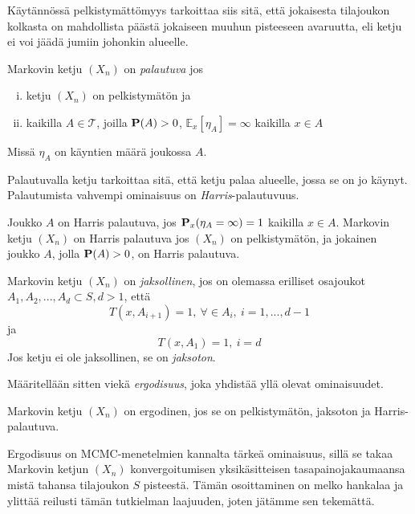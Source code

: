 Käytännössä pelkistymättömyys tarkoittaa siis sitä, että jokaisesta tilajoukon kolkasta on mahdollista päästä jokaiseen muuhun pisteeseen avaruutta, eli ketju ei voi jäädä jumiin johonkin alueelle.

\begin{maar}
	Markovin ketju $(X_n)$ on \textit{palautuva} jos
	\begin{enumerate}[(i)]
		\item ketju $(X_n)$ on pelkistymätön ja
		\item kaikilla $A\in \mathcal{T}$, joilla $\textbf{P}(A)>0$, $\mathbb{E}_x [\eta_A]=\infty$ kaikilla $x\in A$
	\end{enumerate}
	Missä $\eta_A$ on käyntien määrä joukossa $A$.
\end{maar}

Palautuvalla ketju tarkoittaa sitä, että ketju palaa alueelle, jossa se on jo käynyt. Palautumista vahvempi ominaisuus on \textit{Harris}-palautuvuus.

\begin{maar}
	Joukko $A$ on Harris palautuva, jos $\textbf{P}_x(\eta_A =\infty) = 1$ kaikilla $x\in A$. Markovin ketju $(X_n)$ on Harris palautuva jos $(X_n)$ on pelkistymätön, ja jokainen joukko $A$, jolla $\textbf{P}(A)>0$, on Harris palautuva.
\end{maar}

\begin{maar}
	Markovin ketju $(X_n)$ on \emph{jaksollinen}, jos on olemassa erilliset osajoukot $A_1, A_2,...,A_d \subset S, d > 1$, että 
	\begin{equation}
		T(x, A_{i+1}) = 1 , \: \forall \in A_i, \: i=1,...,d-1
	\end{equation}
	ja 
	\begin{equation}
		T(x,A_1)=1, \: i = d
	\end{equation}
	Jos ketju ei ole jaksollinen, se on \textit{jaksoton}.
\end{maar}

Määritellään sitten viekä \emph{ergodisuus}, joka yhdistää yllä olevat ominaisuudet.

\begin{maar}
	Markovin ketju $(X_n)$ on ergodinen, jos se on pelkistymätön, jaksoton ja Harris-palautuva.
\end{maar}

Ergodisuus on MCMC-menetelmien kannalta tärkeä ominaisuus, sillä se takaa Markovin ketjun $(X_n)$ konvergoitumisen yksikäsitteisen tasapainojakaumaansa mistä tahansa tilajoukon $S$ pisteestä. Tämän osoittaminen on melko hankalaa ja ylittää reilusti tämän tutkielman laajuuden, joten jätämme sen tekemättä.



